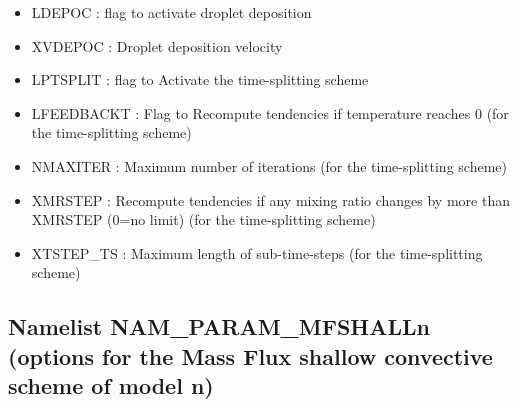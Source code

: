 \begin{itemize}
\item LDEPOC :  flag to activate droplet deposition
\item XVDEPOC : Droplet deposition velocity
\item LPTSPLIT : flag to Activate the time-splitting scheme
\item LFEEDBACKT : Flag to Recompute tendencies if temperature reaches 0 (for the time-splitting scheme)
\item NMAXITER : Maximum number of iterations (for the time-splitting scheme)
\item XMRSTEP : Recompute tendencies if any mixing ratio changes by more than XMRSTEP (0=no limit) (for the time-splitting scheme)
\item XTSTEP\_TS : Maximum length of sub-time-steps (for the time-splitting scheme)
\end{itemize}

\subsection{Namelist NAM\_PARAM\_MFSHALLn (options for the Mass Flux shallow convective
scheme of model n)}


